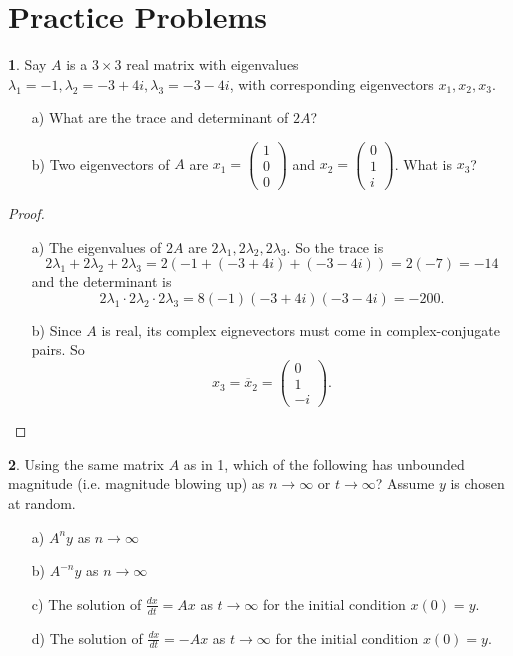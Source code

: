 \documentclass{article}
\theoremstyle{definition}
\newtheorem{prob}{}
\begin{document}
\section*{Practice Problems}
\begin{prob}
	Say $A$ is a $3 \times 3$ real matrix with eigenvalues $\lambda_1=-1, \lambda_2=-3+4i, \lambda_3=-3-4i$, with corresponding eigenvectors $x_1, x_2, x_3$. 
	\begin{itemize}
		\item[a)] What are the trace and determinant of $2A$?
		\item[b)] Two eigenvectors of $A$ are $x_1=\begin{pmatrix}
			1\\0\\0
		\end{pmatrix}$
	and 
	$x_2=\begin{pmatrix}
		0\\1\\i
	\end{pmatrix}$.
What is $x_3$?
	\end{itemize}
\end{prob}

\begin{proof}
	\begin{itemize}
		\item[a)] The eigenvalues of $2A$ are $2\lambda_1, 2\lambda_2, 2\lambda_3$. So the trace is
	\[2\lambda_1+ 2\lambda_2+ 2\lambda_3= 2(-1+ (-3+4i)+ (-3-4i))= 2(-7)=-14 \]
	and the determinant is 
	\[2\lambda_1\cdot 2\lambda_2\cdot 2\lambda_3= 8 (-1) (-3+4i)(-3-4i)= -200.\]
	\item[b)] Since $A$ is real, its complex eignevectors must come in complex-conjugate pairs. So $$x_3= \overline{x}_2=\begin{pmatrix}
		0 \\1\\-i
	\end{pmatrix}.$$
	\end{itemize}
\end{proof}

\begin{prob}
	Using the same matrix $A$ as in 1, which of the following has unbounded magnitude (i.e. magnitude blowing up) as $n \to \infty$ or $t \to \infty$? Assume $y$ is chosen at random.
	\begin{itemize}
		\item[a)] $A^n y$ as $n \to \infty$
		\item[b)] $A^{-n}y$ as $n \to \infty$
		\item[c)] The solution of $\frac{dx}{dt}=Ax$ as $t \to \infty$ for the initial condition $x(0)=y$.
		\item[d)] The solution of $\frac{dx}{dt}=-Ax$ as $t \to \infty$ for the initial condition $x(0)=y$.
	\end{itemize}
\end{prob}
\end{document}
